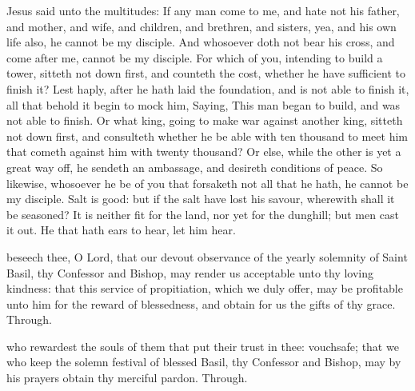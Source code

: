 \alleluianotice



 Jesus said unto the multitudes: If any man come to me, and hate not his father, and mother, and wife, and children, and brethren, and sisters, yea, and his own life also, he cannot be my disciple. And whosoever doth not bear his cross, and come after me, cannot be my disciple. For which of you, intending to build a tower, sitteth not down first, and counteth the cost, whether he have sufficient to finish it? Lest haply, after he hath laid the foundation, and is not able to finish it, all that behold it begin to mock him, Saying, This man began to build, and was not able to finish. Or what king, going to make war against another king, sitteth not down first, and consulteth whether he be able with ten thousand to meet him that cometh against him with twenty thousand? Or else, while the other is yet a great way off, he sendeth an ambassage, and desireth conditions of peace. So likewise, whosoever he be of you that forsaketh not all that he hath, he cannot be my disciple. Salt is good: but if the salt have lost his savour, wherewith shall it be seasoned? It is neither fit for the land, nor yet for the dunghill; but men cast it out. He that hath ears to hear, let him hear.


\secret
{} beseech thee, O Lord, that our devout observance of the yearly solemnity of Saint Basil, thy Confessor and Bishop, may render us acceptable unto thy loving kindness: that this service of propitiation, which we duly offer, may be profitable unto him for the reward of blessedness, and obtain for us the gifts of thy grace. Through.


\postcommunion
{} who rewardest the souls of them that put their trust in thee: vouchsafe; that we who keep the solemn festival of blessed Basil, thy Confessor and Bishop, may by his prayers obtain thy merciful pardon. Through.


\clearpage
{}

